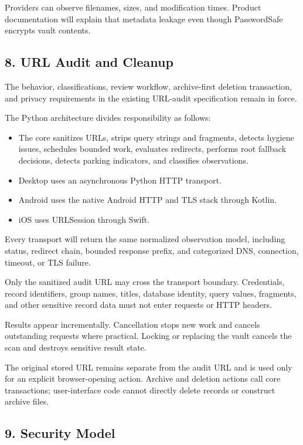 \documentclass[
  letterpaper,
]{article}
\providecommand{\tightlist}{%
  \setlength{\itemsep}{0pt}\setlength{\parskip}{0pt}}
\begin{document}
Providers can observe filenames, sizes, and modification times. Product documentation will explain that metadata leakage
even though PasswordSafe encrypts vault contents.

\subsection{8. URL Audit and Cleanup}\label{8-url-audit-and-cleanup}

The behavior, classifications, review workflow, archive-first deletion transaction, and privacy requirements in the
existing URL-audit specification remain in force.

The Python architecture divides responsibility as follows:

\begin{itemize}
\tightlist
\item
  The core sanitizes URLs, strips query strings and fragments, detects hygiene issues, schedules bounded work, evaluates
  redirects, performs root fallback decisions, detects parking indicators, and classifies observations.
\item
  Desktop uses an asynchronous Python HTTP transport.
\item
  Android uses the native Android HTTP and TLS stack through Kotlin.
\item
  iOS uses URLSession through Swift.
\end{itemize}

Every transport will return the same normalized observation model, including status, redirect chain, bounded response
prefix, and categorized DNS, connection, timeout, or TLS failure.

Only the sanitized audit URL may cross the transport boundary. Credentials, record identifiers, group names, titles,
database identity, query values, fragments, and other sensitive record data must not enter requests or HTTP headers.

Results appear incrementally. Cancellation stops new work and cancels outstanding requests where practical. Locking or
replacing the vault cancels the scan and destroys sensitive result state.

The original stored URL remains separate from the audit URL and is used only for an explicit browser-opening action.
Archive and deletion actions call core transactions; user-interface code cannot directly delete records or construct
archive files.

\subsection{9. Security Model}\label{9-security-model}
\end{document}
